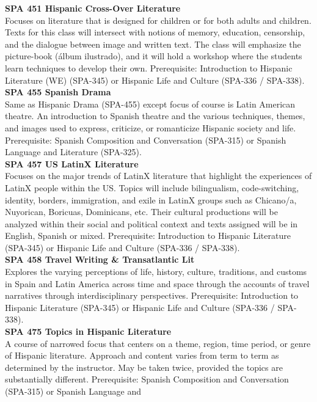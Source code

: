 \documentclass[
  letterpaper,
]{scrbook}
\begin{document}
\textbf{SPA 451 Hispanic Cross-Over Literature}\\
Focuses on literature that is designed for children or for both adults
and children. Texts for this class will intersect with notions of
memory, education, censorship, and the dialogue between image and
written text. The class will emphasize the picture-book (álbum
ilustrado), and it will hold a workshop where the students learn
techniques to develop their own. Prerequisite: Introduction to Hispanic
Literature (WE) (SPA-345) or Hispanic Life and Culture (SPA-336 /
SPA-338).\\
\textbf{SPA 455 Spanish Drama}\\
Same as Hispanic Drama (SPA-455) except focus of course is Latin
American theatre. An introduction to Spanish theatre and the various
techniques, themes, and images used to express, criticize, or
romanticize Hispanic society and life. Prerequisite: Spanish Composition
and Conversation (SPA-315) or Spanish Language and Literature
(SPA-325).\\
\textbf{SPA 457 US LatinX Literature}\\
Focuses on the major trends of LatinX literature that highlight the
experiences of LatinX people within the US. Topics will include
bilingualism, code-switching, identity, borders, immigration, and exile
in LatinX groups such as Chicano/a, Nuyorican, Boricuas, Dominicans,
etc. Their cultural productions will be analyzed within their social and
political context and texts assigned will be in English, Spanish or
mixed. Prerequisite: Introduction to Hispanic Literature (SPA-345) or
Hispanic Life and Culture (SPA-336 / SPA-338).\\
\textbf{SPA 458 Travel Writing \& Transatlantic Lit}\\
Explores the varying perceptions of life, history, culture, traditions,
and customs in Spain and Latin America across time and space through the
accounts of travel narratives through interdisciplinary perspectives.
Prerequisite: Introduction to Hispanic Literature (SPA-345) or Hispanic
Life and Culture (SPA-336 / SPA-338).\\
\textbf{SPA 475 Topics in Hispanic Literature}\\
A course of narrowed focus that centers on a theme, region, time period,
or genre of Hispanic literature. Approach and content varies from term
to term as determined by the instructor. May be taken twice, provided
the topics are substantially different. Prerequisite: Spanish
Composition and Conversation (SPA-315) or Spanish Language and
\end{document}
